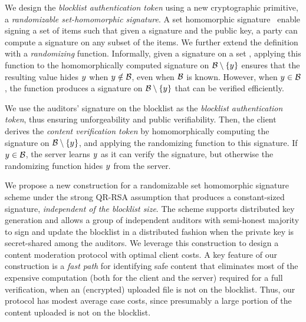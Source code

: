 %

%
We design the \emph{blocklist authentication token} using a new cryptographic primitive, a \emph{randomizable set-homomorphic
signature}. A set homomorphic signature~\cite{johnson2002homomorphic} enable signing a set of items such that given a
signature and the public key, a party can compute a signature
on any subset of the items. We further extend the definition with a \emph{randomizing} function. Informally, given a signature on a
set \blocklist, applying this function to the homomorphically computed
signature on $\blocklist \setminus \{\genericCInputElmt\}$ ensures
that the resulting value hides $\genericCInputElmt$ when
$\genericCInputElmt \notin \blocklist$, even when $\blocklist$ is
known. However, when $\genericCInputElmt \in \blocklist$, the function
produces a signature on $\blocklist \setminus
\{\genericCInputElmt\}$ that can be verified efficiently. 
%


We use the auditors' signature on the
blocklist \blocklist as the \emph{blocklist authentication token}, thus ensuring unforgeability and public verifiability. 
Then, the client derives the \emph{content verification token} by homomorphically computing the signature
on $\blocklist \setminus \{\genericCInputElmt\}$, and applying the
randomizing function to this signature. If $\genericCInputElmt \in
\blocklist$, the server learns $\genericCInputElmt$ as it can verify
the signature, but otherwise the randomizing function hides
$\genericCInputElmt$ from the server. 


%
We propose a new construction for a
randomizable set homomorphic signature scheme under the strong QR-RSA assumption that produces a constant-sized signature, \emph{independent 
of the blocklist size}. The scheme supports distributed key generation and allows a group of independent auditors with semi-honest majority to sign and update the blocklist in a distributed fashion when the private key is secret-shared among the auditors. We leverage this construction to design a content moderation protocol with optimal client costs. 
A key feature of our construction is a \emph{fast path} for identifying safe content that eliminates most of the expensive computation (both for the client and the server) required for a full verification, when an (encrypted) uploaded file is not on the blocklist. Thus, our protocol has modest average case costs, since presumably a large portion of the content uploaded is not on the blocklist. 
\fi 

